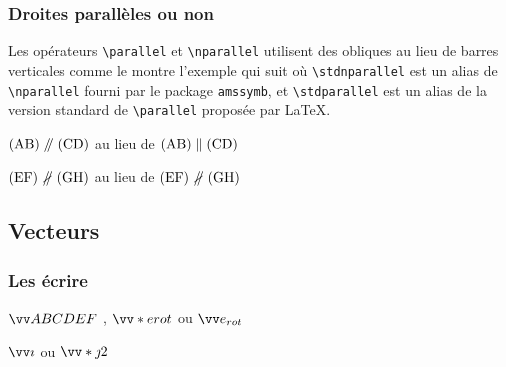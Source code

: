 \documentclass[12pt,a4paper]{article}
\makeatletter
\newcommand\env[1]{\texttt{#1}}
\newcommand\macro[1]{\env{\textbackslash{}#1}}
\theoremstyle{definition}
\newcounter{paraexample}[subsubsection]
\newcommand\@newexample@abstract[2]{%
	\paragraph{%
		#1%
		\if\relax\detokenize{#2}\relax\else {} -- #2\fi%
	}%
}
\newcommand\newparaexample{\@ifstar{\@newparaexample@star}{\@newparaexample@no@star}}
\newcommand\@newparaexample@no@star[1]{%
	\refstepcounter{paraexample}%
	\@newexample@abstract{Exemple \theparaexample}{#1}%
}
\newcommand\@newparaexample@star[1]{%
	\@newexample@abstract{Exemple}{#1}%
}
\makeatother
\begin{document}


\subsubsection{Droites parallèles ou non}

Les opérateurs \macro{parallel} et \macro{nparallel} utilisent des obliques au lieu de barres verticales comme le montre l'exemple qui suit où \macro{stdnparallel} est un alias de \macro{nparallel} fourni par le package \verb+amssymb+, et \macro{stdparallel} est un alias de la version standard de \macro{parallel} proposée par \LaTeX{}.

\begin{latexex}
$\pgline{A}{B} \parallel \pgline{C}{D}$
au lieu de
$\pgline{A}{B}
 \stdparallel \pgline{C}{D}$

$\pgline{E}{F} \nparallel \pgline{G}{H}$
au lieu de
$\pgline{E}{F}
 \stdnparallel \pgline{G}{H}$
\end{latexex}



\subsection{Vecteurs}

\subsubsection{Les écrire}

\newparaexample{}

\begin{latexex}
$\vect{ABCDEF}$  ,
$\vect*{e}{rot}$ ou
$\vect{e_{rot}}$
\end{latexex}




\newparaexample{}

\begin{latexex}
$\vect{i}$ ou
$\vect*{j}{2}$
\end{latexex}


\end{document}
